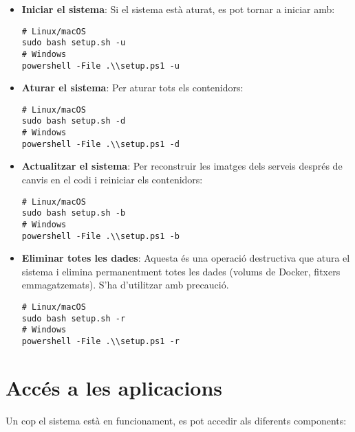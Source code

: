 \begin{itemize}
    \item \textbf{Iniciar el sistema}: Si el sistema està aturat, es pot tornar a iniciar amb:
    \begin{verbatim}
# Linux/macOS
sudo bash setup.sh -u
# Windows
powershell -File .\\setup.ps1 -u
\end{verbatim}

    \item \textbf{Aturar el sistema}: Per aturar tots els contenidors:
    \begin{verbatim}
# Linux/macOS
sudo bash setup.sh -d
# Windows
powershell -File .\\setup.ps1 -d
\end{verbatim}

    \item \textbf{Actualitzar el sistema}: Per reconstruir les imatges dels serveis després de canvis en el codi i reiniciar els contenidors:
    \begin{verbatim}
# Linux/macOS
sudo bash setup.sh -b
# Windows
powershell -File .\\setup.ps1 -b
\end{verbatim}

    \item \textbf{Eliminar totes les dades}: Aquesta és una operació destructiva que atura el sistema i elimina permanentment totes les dades (volums de Docker, fitxers emmagatzemats). S'ha d'utilitzar amb precaució.
    \begin{verbatim}
# Linux/macOS
sudo bash setup.sh -r
# Windows
powershell -File .\\setup.ps1 -r
\end{verbatim}
\end{itemize}

\section{Accés a les aplicacions}
Un cop el sistema està en funcionament, es pot accedir als diferents components:

